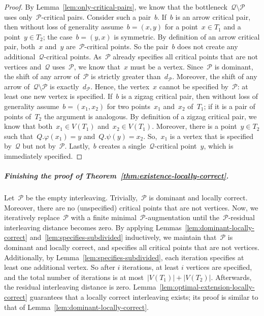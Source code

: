 \documentclass[11pt]{article}
\newcommand{\resdist}[1]{d_{#1}}
\renewcommand{\phi}{\varphi}
\renewcommand{\P}{\mathcal{P}}
\newcommand{\Q}{\mathcal{Q}}
\begin{document}
\begin{proof}
	By Lemma~\ref{lem:only-critical-pairs}, we know that the bottleneck~$\Q \setminus \P$ uses only~$\P$-critical pairs.
	Consider such a pair~$b$.
	If~$b$ is an arrow critical pair, then without loss of generality assume~$b=(x, y)$ for a point~$x \in T_1$ and a point~$y \in T_2$; the case~$b=(y, x)$ is symmetric. 
    By definition of an arrow critical pair, both~$x$ and~$y$ are~$\P$-critical points.
    So the pair~$b$ does not create any additional~$\Q$-critical points.
    As~$\P$ already specifies all critical points that are not vertices and~$\Q$ uses~$\P$, we know that~$x$ must be a vertex.
    Since~$\P$ is dominant, the shift of any arrow of~$\P$ is strictly greater than~$\resdist{\P}$.
    Moreover, the shift of any arrow of~$\Q \setminus \P$ is exactly~$\resdist{\P}$.
    Hence, the vertex~$x$ cannot be specified by~$\P$: at least one new vertex is specified.
%
	If~$b$ is a zigzag critical pair, then without loss of generality assume~$b = (x_1, x_2)$ for two points~$x_1$ and~$x_2$ of~$T_1$; if it is a pair of points of~$T_2$ the argument is analogous.
	By definition of a zigzag critical pair, we know that both~$x_1 \in V(T_1)$ and~$x_2 \in V(T_1)$.
    Moreover, there is a point~$y \in T_2$ such that~$Q.\phi(x_1) = y$ and~$Q.\psi(y) =  x_2$.
    So,~$x_1$ is a vertex that is specified by~$\Q$ but not by~$\P$.
    Lastly,~$b$ creates a single~$\Q$-critical point~$y$, which is immediately specified.
\end{proof}
%
\subparagraph{Finishing the proof of Theorem~\ref{thm:existence-locally-correct}.}
Let~$\P$ be the empty interleaving.
Trivially,~$\P$ is dominant and locally correct.
Moreover, there are no (unspecified) critical points that are not vertices.
Now, we iteratively replace~$\P$ with a finite minimal~$\P$-augmentation until the~$\P$-residual interleaving distance becomes zero.
By applying Lemmas~\ref{lem:dominant-locally-correct} and~\ref{lem:specifies-subdivided} inductively, we maintain that~$\P$ is dominant and locally correct, and specifies all critical points that are not vertices.
Additionally, by Lemma~\ref{lem:specifies-subdivided}, each iteration specifies at least one additional vertex.
So after $i$ iterations, at least $i$ vertices are specified, and the total number of iterations is at most~$|V(T_1)| + |V(T_2)|$.
Afterwards, the residual interleaving distance is zero.
Lemma~\ref{lem:optimal-extension-locally-correct} guarantees that a locally correct interleaving exists; its proof is similar to that of Lemma~\ref{lem:dominant-locally-correct}.
\end{document}
